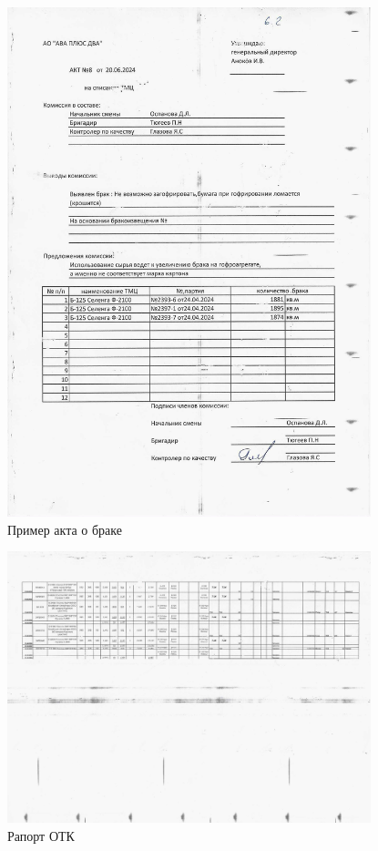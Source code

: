 \begin{figure}
\begin{center}
  \includegraphics[height=0.94\textheight, width=0.94\textwidth, keepaspectratio]{Pics 1/6.2 акт о браке_0001.jpg}
\end{center}
  \caption{Пример акта о браке}
  \label{pic:6.2 акт о браке_0001}
\end{figure}

\begin{figure}
\begin{center}
  \includegraphics[height=0.94\textheight, width=0.94\textwidth, keepaspectratio]{Pics 1/6 рапорт отк_0001.jpg}
\end{center}
  \caption{Рапорт ОТК}
  \label{pic:6 рапорт отк_0001}
\end{figure}

